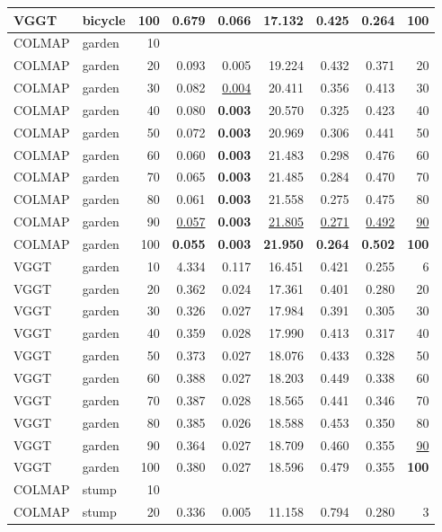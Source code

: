 \begin{table}[H]
\begin{tabular}{llrrrrrrr}
VGGT & bicycle & 100 & 0.679 & 0.066 & 17.132 & 0.425 & 0.264 & \textbf{100} \\
\midrule
COLMAP & garden & 10 &  &  &  &  &  &  \\
COLMAP & garden & 20 & 0.093 & 0.005 & 19.224 & 0.432 & 0.371 & 20 \\
COLMAP & garden & 30 & 0.082 & \underline{0.004} & 20.411 & 0.356 & 0.413 & 30 \\
COLMAP & garden & 40 & 0.080 & \textbf{0.003} & 20.570 & 0.325 & 0.423 & 40 \\
COLMAP & garden & 50 & 0.072 & \textbf{0.003} & 20.969 & 0.306 & 0.441 & 50 \\
COLMAP & garden & 60 & 0.060 & \textbf{0.003} & 21.483 & 0.298 & 0.476 & 60 \\
COLMAP & garden & 70 & 0.065 & \textbf{0.003} & 21.485 & 0.284 & 0.470 & 70 \\
COLMAP & garden & 80 & 0.061 & \textbf{0.003} & 21.558 & 0.275 & 0.475 & 80 \\
COLMAP & garden & 90 & \underline{0.057} & \textbf{0.003} & \underline{21.805} & \underline{0.271} & \underline{0.492} & \underline{90} \\
COLMAP & garden & 100 & \textbf{0.055} & \textbf{0.003} & \textbf{21.950} & \textbf{0.264} & \textbf{0.502} & \textbf{100} \\
VGGT & garden & 10 & 4.334 & 0.117 & 16.451 & 0.421 & 0.255 & 6 \\
VGGT & garden & 20 & 0.362 & 0.024 & 17.361 & 0.401 & 0.280 & 20 \\
VGGT & garden & 30 & 0.326 & 0.027 & 17.984 & 0.391 & 0.305 & 30 \\
VGGT & garden & 40 & 0.359 & 0.028 & 17.990 & 0.413 & 0.317 & 40 \\
VGGT & garden & 50 & 0.373 & 0.027 & 18.076 & 0.433 & 0.328 & 50 \\
VGGT & garden & 60 & 0.388 & 0.027 & 18.203 & 0.449 & 0.338 & 60 \\
VGGT & garden & 70 & 0.387 & 0.028 & 18.565 & 0.441 & 0.346 & 70 \\
VGGT & garden & 80 & 0.385 & 0.026 & 18.588 & 0.453 & 0.350 & 80 \\
VGGT & garden & 90 & 0.364 & 0.027 & 18.709 & 0.460 & 0.355 & \underline{90} \\
VGGT & garden & 100 & 0.380 & 0.027 & 18.596 & 0.479 & 0.355 & \textbf{100} \\
\midrule
COLMAP & stump & 10 &  &  &  &  &  &  \\
COLMAP & stump & 20 & 0.336 & 0.005 & 11.158 & 0.794 & 0.280 & 3 \\

\end{tabular}
\end{table}
